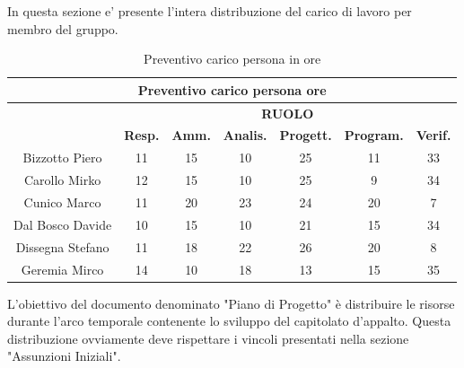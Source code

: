 In questa sezione e' presente l'intera distribuzione del carico di lavoro per membro del gruppo.\\

\begin{table}[!h]
	\begin{center}
		  \begin{tabular}
			  {|c|c|c|c|c|c|c|}
		 \hline
			\multicolumn{7}{|c|}{ \textbf{Preventivo carico persona ore} } \\
			\hline
			& \multicolumn{6}{|c|}{ \textbf{RUOLO} } \\
			\hline
			& \textbf{Resp.} & \textbf{Amm.} & \textbf{Analis.} & \textbf{Progett.} & \textbf{Program.} & \textbf{Verif.} \\
			\hline
			Bizzotto Piero &  11   &  15 &  10   &   25  &  11   &  33   \\ %
			\hline
			Carollo Mirko &  12   &  15  &  10  &  25   &  9   &  34   \\ %
			\hline
			Cunico Marco    &  11   &  20  &  23   &  24   &  20   &  7   \\ %
			\hline
			Dal Bosco Davide        &  10   &  15   &  10   &  21   &   15  &  34  \\ %
			\hline
			Dissegna Stefano        &  11  &  18   & 22  &  26   &  20  &  8  \\ %
			\hline
			Geremia Mirco   &   14  &  10   &  18   &  13  &  15   &  35   \\ %
			\hline		
		\end{tabular}
	\caption{Preventivo carico persona in ore} %
	\label{tab:TabellaPrevPersOre}
	\end{center}	
\end{table}

L'obiettivo del documento denominato "Piano di Progetto" \`e distribuire le risorse durante l'arco temporale 
contenente lo sviluppo del capitolato d'appalto. Questa distribuzione ovviamente deve rispettare i vincoli presentati 
nella sezione "Assunzioni Iniziali".

